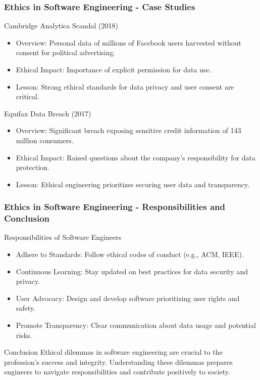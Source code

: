 \documentclass{beamer}
\begin{document}
\begin{frame}[fragile]
    \frametitle{Ethics in Software Engineering - Case Studies}
    \begin{block}{Cambridge Analytica Scandal (2018)}
        \begin{itemize}
            \item Overview: Personal data of millions of Facebook users harvested without consent for political advertising.
            \item Ethical Impact: Importance of explicit permission for data use.
            \item Lesson: Strong ethical standards for data privacy and user consent are critical.
        \end{itemize}
    \end{block}
    
    \begin{block}{Equifax Data Breach (2017)}
        \begin{itemize}
            \item Overview: Significant breach exposing sensitive credit information of 143 million consumers.
            \item Ethical Impact: Raised questions about the company's responsibility for data protection.
            \item Lesson: Ethical engineering prioritizes securing user data and transparency.
        \end{itemize}
    \end{block}
\end{frame}

\begin{frame}[fragile]
    \frametitle{Ethics in Software Engineering - Responsibilities and Conclusion}
    \begin{block}{Responsibilities of Software Engineers}
        \begin{itemize}
            \item Adhere to Standards: Follow ethical codes of conduct (e.g., ACM, IEEE).
            \item Continuous Learning: Stay updated on best practices for data security and privacy.
            \item User Advocacy: Design and develop software prioritizing user rights and safety.
            \item Promote Transparency: Clear communication about data usage and potential risks.
        \end{itemize}
    \end{block}

    \begin{block}{Conclusion}
        Ethical dilemmas in software engineering are crucial to the profession's success and integrity. Understanding these dilemmas prepares engineers to navigate responsibilities and contribute positively to society.
    \end{block}
\end{frame}
\end{document}
